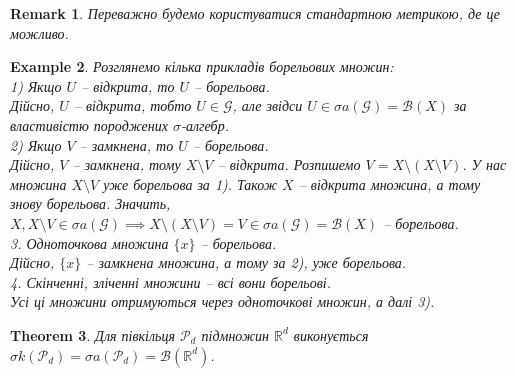 \documentclass[a4paper, 10pt]{article}
\theoremstyle{theoremdd}
\newtheorem{theorem}{Theorem}[subsection]
\newtheorem{example}[theorem]{Example}
\newtheorem{remark}[theorem]{Remark}
\begin{document}
\begin{remark}
Переважно будемо користуватися стандартною метрикою, де це можливо.
\end{remark}

\begin{example}
Розглянемо кілька прикладів борельових множин:\\
1) Якщо $U$ -- відкрита, то $U$ -- борельова.\\
Дійсно, $U$ -- відкрита, тобто $U \in \mathcal{G}$, але звідси $U \in \sigma a(\mathcal{G}) = \mathcal{B}(X)$ за властивістю породжених $\sigma$-алгебр.
\bigskip \\
2) Якщо $V$ -- замкнена, то $U$ -- борельова.\\
Дійсно, $V$ -- замкнена, тому $X \setminus V$ -- відкрита. Розпишемо $V = X \setminus (X \setminus V)$. У нас множина $X \setminus V$ уже борельова за 1). Також $X$ -- відкрита множина, а тому знову борельова. Значить, $X, X \setminus V \in \sigma a(\mathcal{G}) \implies X \setminus (X \setminus V) = V \in \sigma a(\mathcal{G}) = \mathcal{B}(X)$ -- борельова.
\bigskip \\
3. Одноточкова множина $\{x\}$ -- борельова.\\
Дійсно, $\{x\}$ -- замкнена множина, а тому за 2), уже борельова.
\bigskip \\
4. Скінченні, зліченні множини -- всі вони борельові.\\
Усі ці множини отримуються через одноточкові множин, а далі 3).
\end{example}

\begin{theorem}
Для півкільця $\mathcal{P}_d$ підмножин $\mathbb{R}^d$ виконується $\sigma k(\mathcal{P}_d) = \sigma a(\mathcal{P}_d) = \mathcal{B}(\mathbb{R}^d)$.
\end{theorem}
\end{document}
